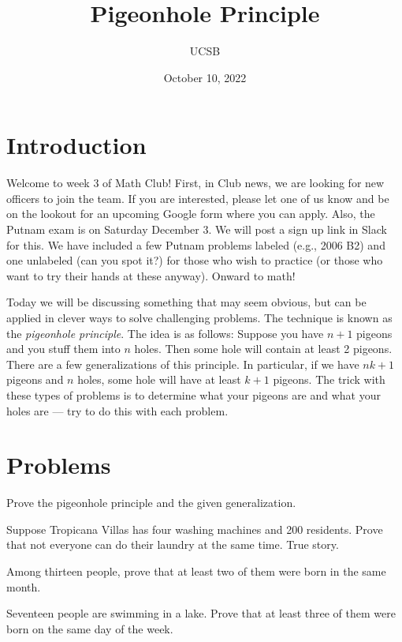 \documentclass{article}
\title{Pigeonhole Principle}
\author{UCSB}
\date{October 10, 2022}
\begin{document}
\section{Introduction}

Welcome to week 3 of Math Club!
First, in Club news, we are looking for new officers to join the team.
If you are interested, please let one of us know and be on the lookout for an upcoming Google form where you can apply.
Also, the Putnam exam is on Saturday December 3.
We will post a sign up link in Slack for this.
We have included a few Putnam problems labeled (e.g., 2006 B2) and one unlabeled (can you spot it?) for those who wish to practice (or those who want to try their hands at these anyway).
Onward to math!

Today we will be discussing something that may seem obvious, but can be applied in clever ways to solve challenging problems.
The technique is known as the \textit{pigeonhole principle}.
The idea is as follows: Suppose you have \(n+1\) pigeons and you stuff them into \(n\) holes.
Then some hole will contain at least 2 pigeons.
There are a few generalizations of this principle.
In particular, if we have \(nk+1\) pigeons and \(n\) holes, some hole will have at least \(k+1\) pigeons.
The trick with these types of problems is to determine what your pigeons are and what your holes are --- try to do this with each problem.

\section{Problems}

\begin{exercise}
    Prove the pigeonhole principle and the given generalization.
\end{exercise}

\begin{exercise}
    Suppose Tropicana Villas has four washing machines and 200 residents.
    Prove that not everyone can do their laundry at the same time.
    True story.
\end{exercise}

\begin{exercise}
    Among thirteen people, prove that at least two of them were born in the same month.
\end{exercise}

\begin{exercise}
    Seventeen people are swimming in a lake.
    Prove that at least three of them were born on the same day of the week.
\end{exercise}
\end{document}
